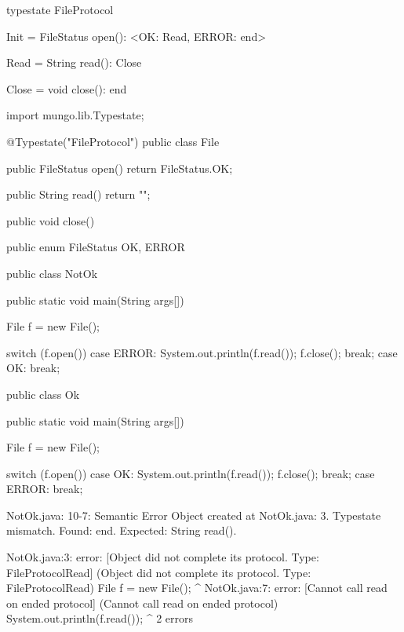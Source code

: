 \begin{code}
typestate FileProtocol {

  Init = {
    FileStatus open(): <OK: Read, ERROR: end>
  }

  Read = {
    String read(): Close
  }

  Close = {
    void close(): end
  }

}\end{code}

\begin{code}
import mungo.lib.Typestate;

@Typestate("FileProtocol")
public class File {

  public FileStatus open() {
    return FileStatus.OK;
  }

  public String read() {
    return "";
  }

  public void close() {

  }

}\end{code}

\begin{code}
public enum FileStatus {
  OK, ERROR
}\end{code}

\begin{code}
public class NotOk {
  public static void main(String args[]) {
    File f = new File();

    switch (f.open()) {
      case ERROR:
        System.out.println(f.read());
        f.close();
        break;
      case OK:
        break;
    }
  }
}\end{code}

\begin{code}
public class Ok {
  public static void main(String args[]) {
    File f = new File();

    switch (f.open()) {
      case OK:
        System.out.println(f.read());
        f.close();
        break;
      case ERROR:
        break;
    }
  }
}\end{code}

\lstset{language=,caption=Original Mungo output}
\begin{code}

NotOk.java: 10-7: Semantic Error
		Object created at NotOk.java: 3. Typestate mismatch. Found: end. Expected: String read().
\end{code}

\lstset{language=,caption=New Mungo output}
\begin{code}
NotOk.java:3: error: [Object did not complete its protocol. Type: FileProtocol{Read}] (Object did not complete its protocol. Type: FileProtocol{Read})
    File f = new File();
         ^
NotOk.java:7: error: [Cannot call read on ended protocol] (Cannot call read on ended protocol)
        System.out.println(f.read());
                                 ^
2 errors
\end{code}

